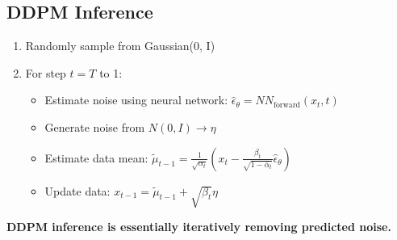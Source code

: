 \documentclass[10pt]{article}
\begin{document}
\subsection*{DDPM Inference}
\begin{enumerate}
	\item Randomly sample from Gaussian(0, I)
	\item For step $t = T$ to 1:
	\begin{itemize}
	    \item Estimate noise using neural network: $\hat{\epsilon}_\theta = NN_{\text{forward}}(x_t, t)$
	    \item Generate noise from $N(0, I) \rightarrow \eta$
	    \item Estimate data mean: $\tilde{\mu}_{t - 1} = \frac{1}{\sqrt{\alpha_t}}\left(x_t - \frac{\beta_t}{\sqrt{1 - \bar{\alpha}_t}} \hat{\epsilon}_\theta\right)$
	    \item Update data: $x_{t - 1} = \tilde{\mu}_{t - 1} + \sqrt{\beta_t} \eta$
    \end{itemize}
\end{enumerate}
\textbf{DDPM inference is essentially iteratively removing predicted noise.}
\end{document}
